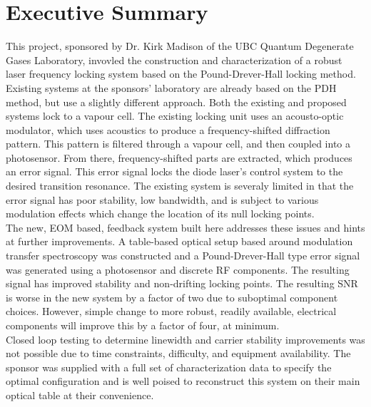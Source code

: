 \newpage
\section*{Executive Summary}

This project, sponsored by Dr. Kirk Madison of the UBC Quantum Degenerate Gases Laboratory, invovled the construction and characterization of a robust laser frequency locking system based on the Pound-Drever-Hall locking method. \\

Existing systems at the sponsors' laboratory are already based on the PDH method, but use a slightly different approach.  Both the existing and proposed systems lock to a vapour cell.  The existing locking unit uses an acousto-optic modulator, which uses acoustics to produce a frequency-shifted diffraction pattern.  This pattern is filtered through a vapour cell, and then coupled into a photosensor.  From there, frequency-shifted parts are extracted, which produces an error signal.  This error signal locks the diode laser's control system to the desired transition resonance. The existing system is severaly limited in that the error signal has poor stability, low bandwidth, and is subject to various modulation effects which change the location of its null locking points. \\

The new, EOM based, feedback system built here addresses these issues and hints at further improvements. A table-based optical setup based around modulation transfer spectroscopy was constructed and a Pound-Drever-Hall type error signal was generated using a photosensor and discrete RF components. The resulting signal has improved stability and non-drifting locking points. The resulting SNR is worse in the new system by a factor of two due to suboptimal component choices. However, simple change to more robust, readily available, electrical components will improve this by a factor of four, at minimum. \\

Closed loop testing to determine linewidth and carrier stability improvements was not possible due to time constraints, difficulty, and equipment availability. The sponsor was supplied with a full set of characterization data to specify the optimal configuration and is well poised to reconstruct this system on their main optical table at their convenience.

